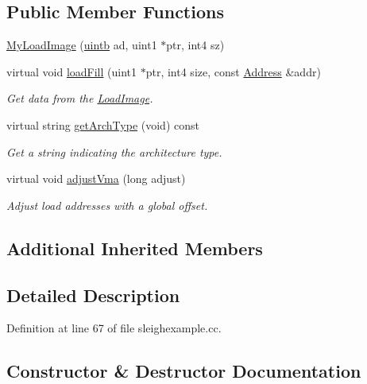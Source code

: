 \subsection*{Public Member Functions}
\begin{DoxyCompactItemize}
\item 
\mbox{\hyperlink{class_my_load_image_af23ad713414f5340c0023ac61179455b}{My\+Load\+Image}} (\mbox{\hyperlink{types_8h_a2db313c5d32a12b01d26ac9b3bca178f}{uintb}} ad, uint1 $\ast$ptr, int4 sz)
\item 
virtual void \mbox{\hyperlink{class_my_load_image_ac06717c19db7a80515b6f330540bce1d}{load\+Fill}} (uint1 $\ast$ptr, int4 size, const \mbox{\hyperlink{class_address}{Address}} \&addr)
\begin{DoxyCompactList}\small\item\em Get data from the \mbox{\hyperlink{class_load_image}{Load\+Image}}. \end{DoxyCompactList}\item 
virtual string \mbox{\hyperlink{class_my_load_image_aae5307e132d6736494b7da8ace1b41f1}{get\+Arch\+Type}} (void) const
\begin{DoxyCompactList}\small\item\em Get a string indicating the architecture type. \end{DoxyCompactList}\item 
virtual void \mbox{\hyperlink{class_my_load_image_aa395d2908f2d6d61295ce0d5995838a9}{adjust\+Vma}} (long adjust)
\begin{DoxyCompactList}\small\item\em Adjust load addresses with a global offset. \end{DoxyCompactList}\end{DoxyCompactItemize}
\subsection*{Additional Inherited Members}


\subsection{Detailed Description}


Definition at line 67 of file sleighexample.\+cc.



\subsection{Constructor \& Destructor Documentation}
\mbox{\label{class_my_load_image_af23ad713414f5340c0023ac61179455b}} 
